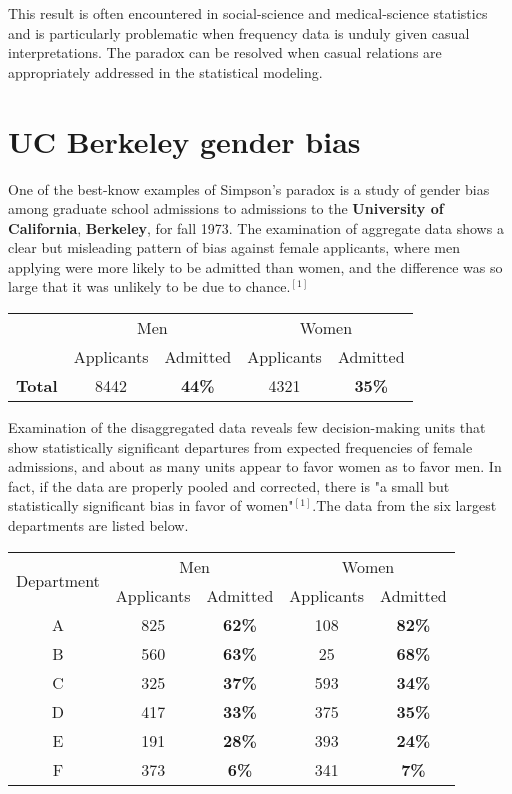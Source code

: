 \documentclass{article}
\begin{document}
This result is often encountered in social-science and medical-science statistics and is particularly problematic when frequency data is unduly given casual interpretations. The paradox can be resolved when casual relations are appropriately addressed in the statistical modeling.

\section{UC Berkeley gender bias}
One of the best-know examples of Simpson's paradox is a study of gender bias among graduate school admissions to admissions to the \textbf{University of California}, \textbf{Berkeley}, for fall 1973. The examination of aggregate data shows a clear but misleading pattern of bias against female applicants, where men applying were more likely to be admitted than women, and the difference was so large that it was unlikely to be due to chance.$^{[1]}$
\begin{center}
    \begin{tabular}{ |c|c|c|c|c| }
    \hline
        \multirow{2}{*}{} 
    &   \multicolumn{2}{|c|}{Men}
    &   \multicolumn{2}{|c|}{Women} \\
    \cline{2-5}
    & Applicants
    & Admitted
    & Applicants
    & Admitted \\
    \hline
    \textbf{Total} & 8442 & \textbf{44\%} & 4321 & \textbf{35\%}\\
    \hline
    \end{tabular}
\end{center}

Examination of the disaggregated data reveals few decision-making units that show statistically significant departures from expected frequencies of female admissions, and about as many units appear to favor women as to favor men.
In fact, if the data are properly pooled and corrected, there is "a small but statistically significant bias in favor of women"$^{[1]}$.The data from the six largest departments are listed below.

\begin{center}
    \begin{tabular}{ |c|c|c|c|c| }
    \hline
        \multirow{2}{*}{Department} 
    &   \multicolumn{2}{|c|}{Men}
    &   \multicolumn{2}{|c|}{Women} \\
    \cline{2-5}
    & Applicants
    & Admitted
    & Applicants
    & Admitted \\
    \hline
    A & 825 & \textbf{62\%} & 108 & \textbf{82\%} \\
    \hline
    B & 560 & \textbf{63\%} & 25 & \textbf{68\%} \\
    \hline
    C & 325 & \textbf{37\%} & 593 & \textbf{34\%} \\
    \hline
    D & 417 & \textbf{33\%} & 375 & \textbf{35\%} \\
    \hline
    E & 191 & \textbf{28\%} & 393 & \textbf{24\%} \\
    \hline
    F & 373 & \textbf{6\%} & 341 & \textbf{7\%} \\
    \hline
    \end{tabular}
\end{center}
\end{document}
